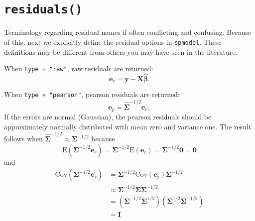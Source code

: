 \documentclass[10pt,letterpaper]{article}
\begin{document}
\hypertarget{sec:residuals}{%
\section{\texorpdfstring{\texttt{residuals()}}{residuals()}}\label{sec:residuals}}

Terminology regarding residual names if often conflicting and confusing.
Because of this, next we explicitly define the residual options in
\texttt{spmodel}. These definitions may be different from others you may
have seen in the literature.

When \texttt{type\ =\ "raw"}, raw residuals are returned:
\begin{equation*}
 \mathbf{e}_{r} = \mathbf{y} - \mathbf{X} \hat{\boldsymbol{\beta}}.
\end{equation*}

When \texttt{type\ =\ "pearson"}, pearson residuals are returned:
\begin{equation*}
 \mathbf{e}_{p} = \hat{\boldsymbol{\Sigma}}^{-1/2}\mathbf{e}_{r},
\end{equation*} If the errors are normal (Gaussian), the pearson
residuals should be approximately normally distributed with mean zero
and variance one. The result follows when
\(\hat{\boldsymbol{\Sigma}}^{-1/2} \approx \boldsymbol{\Sigma}^{-1/2}\)
because \begin{equation*}
  \text{E}(\boldsymbol{\Sigma}^{-1/2} \mathbf{e}_{r}) = \boldsymbol{\Sigma}^{-1/2} \text{E}(\mathbf{e}_{r}) = \boldsymbol{\Sigma}^{-1/2} \boldsymbol{0} = \boldsymbol{0}
\end{equation*} and \begin{equation*}
  \begin{split}
  \text{Cov}(\boldsymbol{\Sigma}^{-1/2} \mathbf{e}_{r}) & = \boldsymbol{\Sigma}^{-1/2} \text{Cov}(\mathbf{e}_{r}) \boldsymbol{\Sigma}^{-1/2} \\
  & \approx \boldsymbol{\Sigma}^{-1/2} \boldsymbol{\Sigma} \boldsymbol{\Sigma}^{-1/2} \\
  & = (\boldsymbol{\Sigma}^{-1/2} \boldsymbol{\Sigma}^{1/2})(\boldsymbol{\Sigma}^{1/2} \boldsymbol{\Sigma}^{-1/2}) \\
  & = \mathbf{I}
  \end{split}
\end{equation*}
\end{document}
